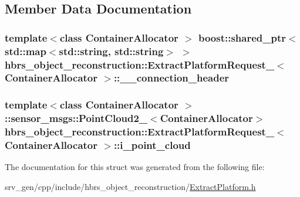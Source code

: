 \subsection{\-Member \-Data \-Documentation}
\hypertarget{structhbrs__object__reconstruction_1_1_extract_platform_request___a0fb714ab3e397286dfccea2174974c73}{
\subsubsection[{\-\_\-\-\_\-connection\-\_\-header}]{\setlength{\rightskip}{0pt plus 5cm}template$<$class Container\-Allocator $>$ boost\-::shared\-\_\-ptr$<$std\-::map$<$std\-::string, std\-::string$>$ $>$ {\bf hbrs\-\_\-object\-\_\-reconstruction\-::\-Extract\-Platform\-Request\-\_\-}$<$ \-Container\-Allocator $>$\-::{\bf \-\_\-\-\_\-connection\-\_\-header}}}\label{structhbrs__object__reconstruction_1_1_extract_platform_request___a0fb714ab3e397286dfccea2174974c73}
\hypertarget{structhbrs__object__reconstruction_1_1_extract_platform_request___ad4b49e131ac9acd23266f639c64def23}{
\subsubsection[{i\-\_\-point\-\_\-cloud}]{\setlength{\rightskip}{0pt plus 5cm}template$<$class Container\-Allocator $>$ \-::sensor\-\_\-msgs\-::\-Point\-Cloud2\-\_\-$<$\-Container\-Allocator$>$ {\bf hbrs\-\_\-object\-\_\-reconstruction\-::\-Extract\-Platform\-Request\-\_\-}$<$ \-Container\-Allocator $>$\-::{\bf i\-\_\-point\-\_\-cloud}}}\label{structhbrs__object__reconstruction_1_1_extract_platform_request___ad4b49e131ac9acd23266f639c64def23}


\-The documentation for this struct was generated from the following file\-:\begin{DoxyCompactItemize}
\item 
srv\-\_\-gen/cpp/include/hbrs\-\_\-object\-\_\-reconstruction/\hyperlink{_extract_platform_8h}{\-Extract\-Platform.\-h}\end{DoxyCompactItemize}
